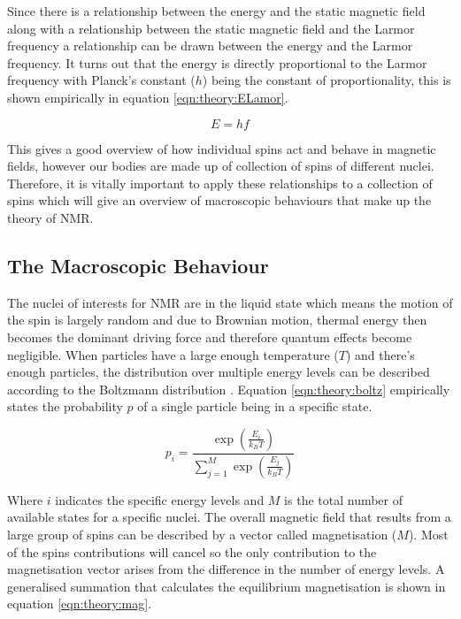 Since there is a relationship between the energy and the static magnetic field along with a relationship between the static magnetic field and the Larmor frequency a relationship can be drawn between the energy and the Larmor frequency. It turns out that the energy is directly proportional to the Larmor frequency with Planck's constant ($h$) being the constant of proportionality, this is shown empirically in equation \ref{eqn:theory:ELamor}.

\begin{equation}
    E = hf
    \label{eqn:theory:ELamor}
\end{equation}

This gives a good overview of how individual spins act and behave in magnetic fields, however our bodies are made up of collection of spins of different nuclei. Therefore, it is vitally important to apply these relationships to a collection of spins which will give an overview of macroscopic behaviours that make up the theory of \ac{NMR}.

\subsection{The Macroscopic Behaviour}

The nuclei of interests for \ac{NMR} are in the liquid state which means the motion of the spin is largely random and due to Brownian motion, thermal energy then becomes the dominant driving force and therefore quantum effects become negligible. When particles have a large enough temperature ($T$) and there's enough particles, the distribution over multiple energy levels can be described according to the Boltzmann distribution \cite{Boltzmann1872WeitereGasmolekulen}. Equation \ref{eqn:theory:boltz} empirically states the probability $p$ of a single particle being in a specific state.

\begin{equation}
    p_i = \frac{\exp\left(\frac{E_i}{k_BT}\right)}{\displaystyle \sum_{j = 1}^{M}\exp\left(\frac{E_j}{k_BT}\right)}
    \label{eqn:theory:boltz}
\end{equation}

Where $i$ indicates the specific energy levels and $M$ is the total number of available states for a specific nuclei. The overall magnetic field that results from a large group of spins can be described by a vector called magnetisation ($M$). Most of the spins contributions will cancel so the only contribution to the magnetisation vector arises from the difference in the number of energy levels. A generalised summation that calculates the equilibrium magnetisation is shown in equation \ref{eqn:theory:mag}.

